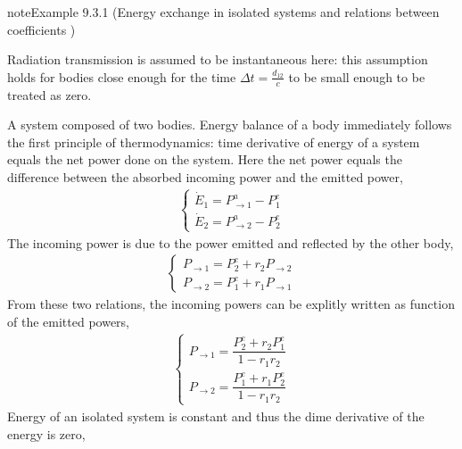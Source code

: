 \documentclass[letterpaper,10pt,english]{jupyterBook}
\begin{document}
\begin{sphinxadmonition}{note}{Example 9.3.1 (Energy exchange in isolated systems and relations between coefficients \sphinxhyphen{}  )}



\sphinxAtStartPar
Radiation transmission is assumed to be instantaneous here: this assumption holds for bodies close enough for the time \(\Delta t = \frac{d_{12}}{c}\) to be small enough to be treated as zero.

\sphinxAtStartPar
A system composed of two bodies. Energy balance of a body immediately follows the first principle of thermodynamics: time derivative of energy of a system equals the net power done on the system. Here the net power equals the difference between the absorbed incoming power and the emitted power,
\begin{equation*}
\begin{split}\begin{cases} 
  \dot{E}_1 = P^a_{\rightarrow 1} - P_1^e \\
  \dot{E}_2 = P^a_{\rightarrow 2} - P_2^e
\end{cases}\end{split}
\end{equation*}
\sphinxAtStartPar
{} The incoming power is due to the power emitted and reflected by the other body,
\begin{equation*}
\begin{split}\begin{cases}
  P_{\rightarrow 1} = P_{2}^e + r_2 P_{\rightarrow 2} \\
  P_{\rightarrow 2} = P_{1}^e + r_1 P_{\rightarrow 1} 
\end{cases}\end{split}
\end{equation*}
\sphinxAtStartPar
From these two relations, the incoming powers can be explitly written as function of the emitted powers,
\begin{equation*}
\begin{split}\begin{cases}
  P_{\rightarrow 1} = \dfrac{P_2^e + r_2 P_1^e}{1 - r_1 r_2} \\
  P_{\rightarrow 2} = \dfrac{P_1^e + r_1 P_2^e}{1 - r_1 r_2}
\end{cases}\end{split}
\end{equation*}
\sphinxAtStartPar
{} Energy of an isolated system is constant and thus the dime derivative of the energy is zero,

\end{sphinxadmonition}
\end{document}
